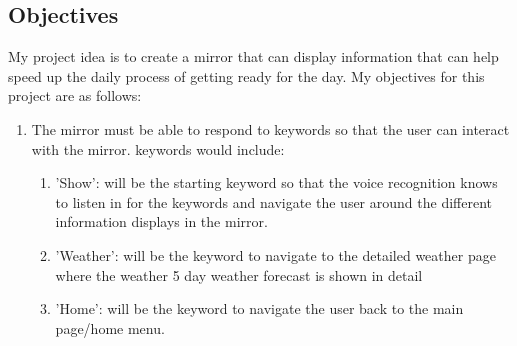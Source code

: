 \documentclass[12pt]{article}
\begin{document}
    \newpage

    \subsection{Objectives}

        My project idea is to create a mirror that can display information that can help speed up the daily process of getting ready for the day. My objectives for this project are as follows:
        \begin{enumerate}

            \item The mirror must be able to respond to keywords so that the user can interact with the mirror. keywords would include:
             \renewcommand{\labelenumii}{\Roman{enumii}}
                \begin{enumerate}

                    \item 'Show': will be the starting keyword so that the voice recognition knows to listen in for the keywords and navigate the user around the different information displays in the mirror.

                    \item 'Weather': will be the keyword to navigate to the detailed weather page where the weather 5 day weather forecast is shown in detail

                    \item 'Home': will be the keyword to navigate the user back to the main page/home menu.


\end{enumerate}
\end{enumerate}
\end{document}
